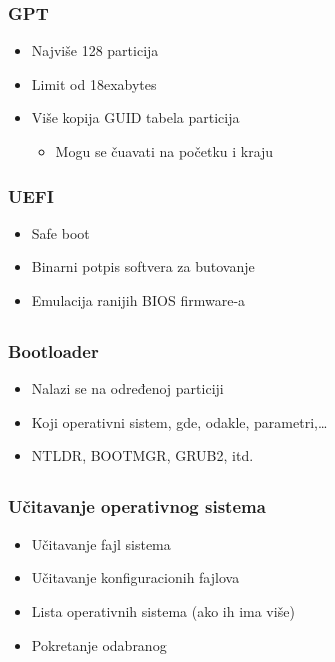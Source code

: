 \documentclass{beamer}
\begin{document}
\begin{frame}
    \frametitle{GPT}
    \begin{itemize}
        \item Najviše 128 particija \newline
        \item Limit od 18exabytes \newline
        \item Više kopija GUID tabela particija \begin{itemize}
            \item Mogu se čuavati na početku i kraju
        \end{itemize}
    \end{itemize}
\end{frame}

\begin{frame}
    \frametitle{UEFI}
    \begin{itemize}
        \item Safe boot \newline
        \item Binarni potpis softvera za butovanje \newline
        \item Emulacija ranijih BIOS firmware-a
    \end{itemize}
\end{frame}

\subsection*{}

\begin{frame}
    \frametitle{Bootloader}
    \begin{itemize}
        \item Nalazi se na određenoj particiji \newline
        \item Koji operativni sistem, gde, odakle, parametri,\dots \newline
        \item NTLDR, BOOTMGR, GRUB2, itd.
    \end{itemize}
\end{frame}
\subsection*{}
\begin{frame}
    \frametitle{Učitavanje operativnog sistema}
    \begin{itemize}
        \item Učitavanje fajl sistema \newline
        \item Učitavanje konfiguracionih fajlova \newline
        \item Lista operativnih sistema (ako ih ima više) \newline
        \item Pokretanje odabranog
    \end{itemize}
\end{frame}
\end{document}
